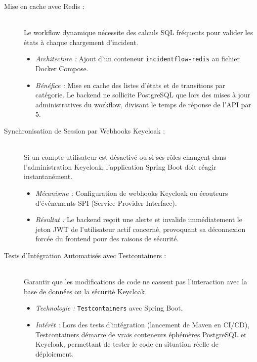 \documentclass[12pt,a4paper]{article}
\begin{document}
\begin{description}
    \item[Mise en cache avec Redis :] \hfill \\
    Le workflow dynamique nécessite des calculs SQL fréquents pour valider les états à chaque chargement d'incident.
    \begin{itemize}
        \item \textit{Architecture :} Ajout d'un conteneur \texttt{incidentflow-redis} au fichier Docker Compose.
        \item \textit{Bénéfice :} Mise en cache des listes d'états et de transitions par catégorie. Le backend ne sollicite PostgreSQL que lors des mises à jour administratives du workflow, divisant le temps de réponse de l'API par 5.
    \end{itemize}

    \item[Synchronisation de Session par Webhooks Keycloak :] \hfill \\
    Si un compte utilisateur est désactivé ou si ses rôles changent dans l'administration Keycloak, l'application Spring Boot doit réagir instantanément.
    \begin{itemize}
        \item \textit{Mécanisme :} Configuration de webhooks Keycloak ou écouteurs d'événements SPI (Service Provider Interface).
        \item \textit{Résultat :} Le backend reçoit une alerte et invalide immédiatement le jeton JWT de l'utilisateur actif concerné, provoquant sa déconnexion forcée du frontend pour des raisons de sécurité.
    \end{itemize}

    \item[Tests d'Intégration Automatisés avec Testcontainers :] \hfill \\
    Garantir que les modifications de code ne cassent pas l'interaction avec la base de données ou la sécurité Keycloak.
    \begin{itemize}
        \item \textit{Technologie :} \texttt{Testcontainers} avec Spring Boot.
        \item \textit{Intérêt :} Lors des tests d'intégration (lancement de Maven en CI/CD), Testcontainers démarre de vrais conteneurs éphémères PostgreSQL et Keycloak, permettant de tester le code en situation réelle de déploiement.
    \end{itemize}


\end{description}
\end{document}

